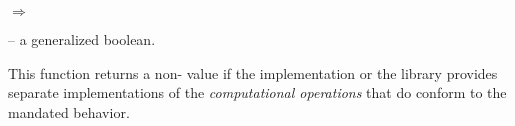 \documentclass[../Environment-Queries.tex]{subfiles}
\begin{document}

\DSyntax{}

 
$\Rightarrow$ 

\DArgsNValues{}

 -- a generalized boolean.


\DDescription{}

This function returns a non- value if the \CL{}
implementation or the \CL{} library provides separate implementations
of the \emph{computational operations} that do conform to the \IEEEFPStd{}
mandated behavior.
\end{document}
